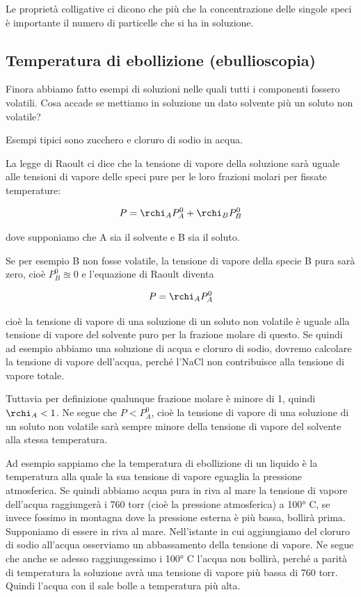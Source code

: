 Le proprietà colligative ci dicono che più che la concentrazione delle singole speci è importante il numero di particelle che si ha in soluzione.
\subsection{Temperatura di ebollizione (ebullioscopia)}
Finora abbiamo fatto esempi di soluzioni nelle quali tutti i componenti fossero volatili. Cosa accade se mettiamo in soluzione un dato solvente più un soluto non volatile?

Esempi tipici sono zucchero e cloruro di sodio in acqua.

La legge di Raoult ci dice che la tensione di vapore della soluzione sarà uguale alle tensioni di vapore delle speci pure per le loro frazioni molari per fissate temperature:

$$P=\rchi_AP^0_A + \rchi_BP^0_B$$

dove supponiamo che A sia il solvente e B sia il soluto.

Se per esempio B non fosse volatile, la tensione di vapore della specie B pura sarà zero, cioè $P_B^0 \approxeq 0$ e l'equazione di Raoult diventa

$$P=\rchi_A P_A^0$$

cioè la tensione di vapore di una soluzione di un soluto non volatile è uguale alla tensione di vapore del solvente puro per la frazione molare di questo. Se quindi ad esempio abbiamo una soluzione di acqua e cloruro di sodio, dovremo calcolare la tensione di vapore dell'acqua, perché l'NaCl non contribuisce alla tensione di vapore totale.

Tuttavia per definizione qualunque frazione molare è minore di 1, quindi $\rchi_A<1$. Ne segue che $P < P_A^0$, cioè la tensione di vapore di una soluzione di un soluto non volatile sarà sempre minore della tensione di vapore del solvente alla stessa temperatura.

Ad esempio sappiamo che la temperatura di ebollizione di un liquido è la temperatura alla quale la sua tensione di vapore eguaglia la pressione atmosferica. Se quindi abbiamo acqua pura in riva al mare la tensione di vapore dell'acqua raggiungerà i 760 torr (cioè la pressione atmosferica) a 100° C, se invece fossimo in montagna dove la pressione esterna è più bassa, bollirà prima. Supponiamo di essere in riva al mare. Nell'istante in cui aggiungiamo del cloruro di sodio all'acqua osserviamo un abbassamento della tensione di vapore. Ne segue che anche se adesso raggiungessimo i 100° C l'acqua non bollirà, perché a parità di temperatura la soluzione avrà una tensione di vapore più bassa di 760 torr. Quindi l'acqua con il sale bolle a temperatura più alta.

